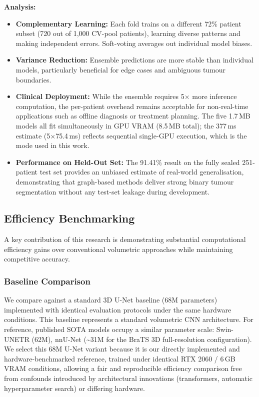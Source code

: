 \documentclass{article}
\begin{document}
\textbf{Analysis:}
\begin{itemize}
    \item \textbf{Complementary Learning:} Each fold trains on a different 72\% patient subset (720 out of 1,000 CV-pool patients), learning diverse patterns and making independent errors. Soft-voting averages out individual model biases.

    \item \textbf{Variance Reduction:} Ensemble predictions are more stable than individual models, particularly beneficial for edge cases and ambiguous tumour boundaries.

    \item \textbf{Clinical Deployment:} While the ensemble requires 5$\times$ more inference computation, the per-patient overhead remains acceptable for non-real-time applications such as offline diagnosis or treatment planning. The five 1.7\,MB models all fit simultaneously in GPU VRAM (8.5\,MB total); the 377\,ms estimate (5$\times$75.4\,ms) reflects sequential single-GPU execution, which is the mode used in this work.

    \item \textbf{Performance on Held-Out Set:} The 91.41\% result on the fully sealed 251-patient test set provides an unbiased estimate of real-world generalisation, demonstrating that graph-based methods deliver strong binary tumour segmentation without any test-set leakage during development.
\end{itemize}


\subsection{Efficiency Benchmarking}

A key contribution of this research is demonstrating substantial computational efficiency gains over conventional volumetric approaches while maintaining competitive accuracy.

\subsubsection{Baseline Comparison}

We compare against a standard 3D U-Net baseline (68M parameters) implemented with identical evaluation protocols under the same hardware conditions. This baseline represents a standard volumetric CNN architecture. For reference, published SOTA models occupy a similar parameter scale: Swin-UNETR \cite{hatamizadeh2022swin} (62M), nnU-Net \cite{isensee2021nnunet} (\textasciitilde31M for the BraTS 3D full-resolution configuration). We select this 68M U-Net variant because it is our directly implemented and hardware-benchmarked reference, trained under identical RTX 2060 / 6\,GB VRAM conditions, allowing a fair and reproducible efficiency comparison free from confounds introduced by architectural innovations (transformers, automatic hyperparameter search) or differing hardware.
\end{document}
